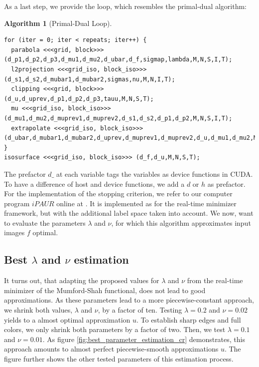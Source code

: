 \documentclass{scrreprt}
\newtheorem{algorithm}[theorem]{Algorithm}
\begin{document}
            As a last step, we provide the loop, which resembles the primal-dual algorithm:

            \begin{algorithm}[Primal-Dual Loop]
                \label{alg:primal_dual_loop}
                \begin{lstlisting}
for (iter = 0; iter < repeats; iter++) {
  parabola <<<grid, block>>> (d_p1,d_p2,d_p3,d_mu1,d_mu2,d_ubar,d_f,sigmap,lambda,M,N,S,I,T);
  l2projection <<<grid_iso, block_iso>>> (d_s1,d_s2,d_mubar1,d_mubar2,sigmas,nu,M,N,I,T);
  clipping <<<grid, block>>> (d_u,d_uprev,d_p1,d_p2,d_p3,tauu,M,N,S,T);
  mu <<<grid_iso, block_iso>>> (d_mu1,d_mu2,d_muprev1,d_muprev2,d_s1,d_s2,d_p1,d_p2,M,N,S,I,T);
  extrapolate <<<grid_iso, block_iso>>> (d_ubar,d_mubar1,d_mubar2,d_uprev,d_muprev1,d_muprev2,d_u,d_mu1,d_mu2,M,N,S,I,T);
}
isosurface <<<grid_iso, block_iso>>> (d_f,d_u,M,N,S,T);
                \end{lstlisting}
            \end{algorithm}

            The prefactor $d\_$ at each variable tags the variables as device functions in CUDA. To have a difference of host and device functions, we add a $d$ or $h$ as prefactor. For the implementation of the stopping criterion, we refer to our computer program $iPAUR$ online at \cite{Bauer}. It is implemented as for the real-time minimizer framework, but with the additional label space taken into account. We now, want to evaluate the parameters $\lambda$ and $\nu$, for which this algorithm approximates input images $f$ optimal.


        \subsection{Best $\lambda$ and $\nu$ estimation} %
        \label{sub:best_lambda_and_nu_estimation}

            It turns out, that adapting the proposed values for $\lambda$ and $\nu$ from the real-time minimizer of the Mumford-Shah functional, does not lead to good approximations. As these parameters lead to a more piecewise-constant approach, we shrink both values, $\lambda$ and $\nu$, by a factor of ten. Testing $\lambda = 0.2$ and $\nu = 0.02$ yields to a almost optimal approximation $u$. To establish sharp edges and full colors, we only shrink both parameters by a factor of two. Then, we test $\lambda = 0.1$ and $\nu = 0.01$. As figure \ref{fig:best_parameter_estimation_cr} demonstrates, this approach amounts to almost perfect piecewise-smooth approximations $u$. The figure further shows the other tested parameters of this estimation process.
\end{document}
